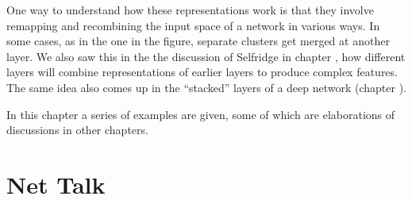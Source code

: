One way to understand how these representations work is that they involve remapping and recombining the input space of a network in various ways. In some cases, as in the one in the figure, separate clusters get merged at another layer.  We also saw this in the the discussion of Selfridge in chapter , how different layers will combine representations of earlier layers to produce complex features. The same idea also comes up in the ``stacked'' layers of a deep network (chapter ). 

In this chapter a series of examples are given, some of which are elaborations of discussions in other chapters.


\section{Net Talk}


